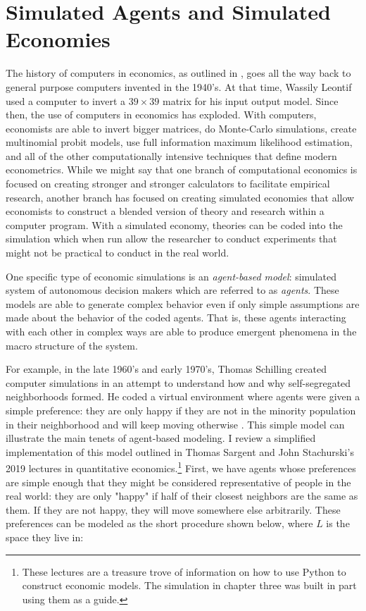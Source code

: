 \documentclass[12pt,twoside]{reedthesis}
\begin{document}
	
\section{Simulated Agents and Simulated Economies}
The history of computers in economics, as outlined in \citet{Backhouse2016}, goes all the way back to general purpose computers invented in the 1940's. At that time, Wassily Leontif used a computer to invert a $39 \times 39$ matrix for his input output model. Since then, the use of computers in economics has exploded. With computers, economists are able to invert bigger matrices, do Monte-Carlo simulations, create multinomial probit models, use full information maximum likelihood estimation, and all of the other computationally intensive techniques that define modern econometrics. While we might say that one branch of computational economics is focused on creating stronger and stronger calculators to facilitate empirical research, another branch has focused on creating simulated economies that allow economists to construct a blended version of theory and research within a computer program. With a simulated economy, theories can be coded into the simulation which when run allow the researcher to conduct experiments that might not be practical to conduct in the real world. 

One specific type of economic simulations is an {\em agent-based model}: simulated system of autonomous decision makers which are referred to as {\em agents}. These models are able to generate complex behavior even if only simple assumptions are made about the behavior of the coded agents. That is, these agents interacting with each other in complex ways are able to produce emergent phenomena in the macro structure of the system.

For example, in the late 1960's and early 1970's, Thomas Schilling created computer simulations in an attempt to understand how and why self-segregated neighborhoods formed. He coded a virtual environment where agents were given a simple preference: they are only happy if they are not in the minority population in their neighborhood and will keep moving otherwise \citep{Schelling1969}. This simple model can illustrate the main tenets of agent-based modeling. I review a simplified implementation of this model outlined in Thomas Sargent and John Stachurski's 2019 lectures in quantitative economics.\footnote{These lectures are a treasure trove of information on how to use Python to construct economic models. The simulation in chapter three was built in part using them as a guide.} First, we have agents whose preferences are simple enough that they might be considered representative of people in the real world: they are only "happy" if half of their closest neighbors are the same as them. If they are not happy, they will move somewhere else arbitrarily. These preferences can be modeled as the short procedure shown below, where $L$ is the space they live in:
\end{document}
